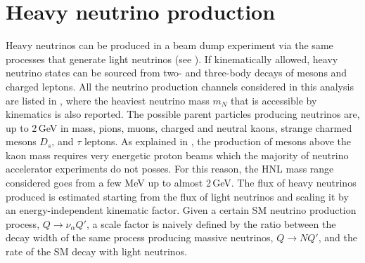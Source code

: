 \section{Heavy neutrino production}
\label{sec:production}


Heavy neutrinos can be produced in a beam dump experiment via the same processes %
that generate light neutrinos (see ).
If kinematically allowed, heavy neutrino states can be sourced from two- and three-body decays of mesons and charged leptons.
All the neutrino production channels considered in this analysis are listed in , %
where the heaviest neutrino mass $m_N$ that is accessible by kinematics is also reported.
The possible parent particles producing neutrinos are, up to 2\,GeV in mass, %
pions, muons, charged and neutral kaons, strange charmed mesons $D_s$, and $\tau$ leptons.
As explained in , the production of mesons above the kaon mass requires very energetic proton beams %
which the majority of neutrino accelerator experiments do not posses.
For this reason, the HNL mass range considered goes from a few MeV up to almost 2\,GeV.
The flux of heavy neutrinos produced is estimated starting from the flux of light neutrinos %
and scaling it by an energy-independent kinematic factor.
Given a certain SM neutrino production process, $Q \to \nu_\alpha Q'$, %
a scale factor is naively defined by the ratio between the decay width of the same process producing massive neutrinos, %
$Q \to N Q'$, and the rate of the SM decay with light neutrinos.
